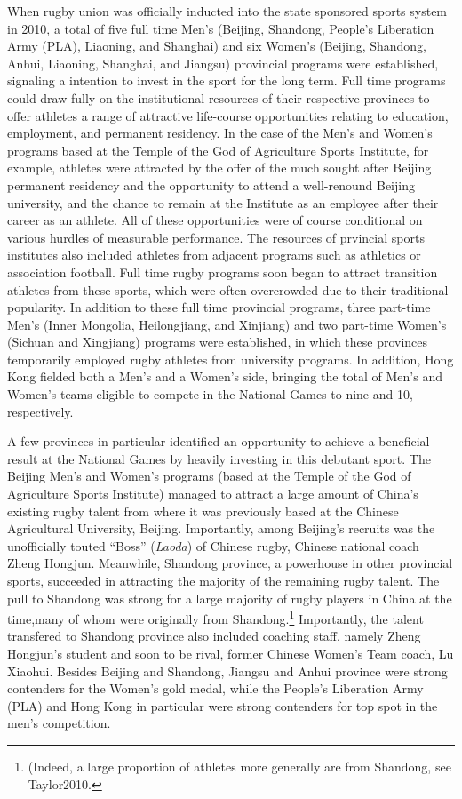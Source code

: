 {When rugby union was officially inducted into the state sponsored sports system in 2010, a total of five full time Men's (Beijing, Shandong, People's Liberation Army (PLA), Liaoning, and Shanghai) and six Women's (Beijing, Shandong, Anhui, Liaoning, Shanghai, and Jiangsu) provincial programs were established, signaling a intention to invest in the sport for the long term.  Full time programs could draw fully on the institutional resources of their respective provinces to offer athletes a range of attractive life-course opportunities relating to education, employment, and permanent residency.  In the case of the Men's and Women's programs based at the Temple of the God of Agriculture Sports Institute, for example, athletes were attracted by the offer of the much sought after Beijing permanent residency and the opportunity to attend a well-renound Beijing university, and the chance to remain at the Institute as an employee after their career as an athlete.  All of these opportunities were of course conditional on various hurdles of measurable performance.  The resources of prvincial sports institutes also included athletes from adjacent programs such as athletics or association football.  Full time rugby programs soon began to attract transition athletes from these sports, which were often overcrowded due to their traditional popularity.  In addition to these full time provincial programs, three part-time Men's (Inner Mongolia, Heilongjiang, and Xinjiang) and two part-time Women's (Sichuan and Xingjiang) programs were established, in which these provinces temporarily employed rugby athletes from university programs. In addition, Hong Kong fielded both a Men's and a Women's side, bringing the total of Men's and Women's teams eligible to compete in the National Games to nine and 10, respectively.

A few provinces in particular identified an opportunity to achieve a beneficial result at the National Games by heavily investing in this debutant sport.  The Beijing Men's and Women's programs (based at the Temple of the God of Agriculture Sports Institute) managed to attract a large amount of China's existing rugby talent from where it was previously based at the Chinese Agricultural University, Beijing.  Importantly, among Beijing's recruits was the unofficially touted ``Boss''  (\textit{Laoda}) of Chinese rugby, Chinese national coach Zheng Hongjun.  Meanwhile, Shandong province, a powerhouse in other provincial sports, succeeded in attracting the majority of the remaining rugby talent. The pull to Shandong was strong for a large majority of rugby players in China at the time,many of whom were originally from Shandong.\footnote{(Indeed, a large proportion of athletes more generally are from Shandong, see Taylor2010.}  Importantly, the talent transfered to Shandong province also included coaching staff, namely Zheng Hongjun's student and soon to be rival, former Chinese Women's Team coach, Lu Xiaohui.  Besides Beijing and Shandong, Jiangsu and Anhui province were strong contenders for the Women's gold medal, while the People's Liberation Army (PLA) and Hong Kong in particular were strong contenders for top spot in the men's competition.

}
